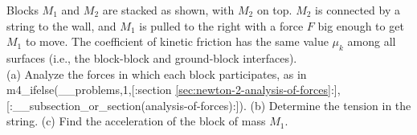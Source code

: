 Blocks $M_1$ and $M_2$ are stacked as shown, with $M_2$ on top. $M_2$
is connected by a string to the wall, and $M_1$ is pulled to the
right with a force $F$ big enough to get $M_1$ to
move. The coefficient of kinetic friction has the same value $\mu_k$ among all surfaces
(i.e., the block-block and ground-block interfaces).\\
%
(a) Analyze the forces in which each block participates, as in
m4_ifelse(__problems,1,[:section \ref{sec:newton-2-analysis-of-forces}:],[:__subsection_or_section(analysis-of-forces):]).\hwendpart
%
(b) Determine the tension in the string.\hwendpart
%
(c) Find the acceleration of the block of mass $M_1$.
